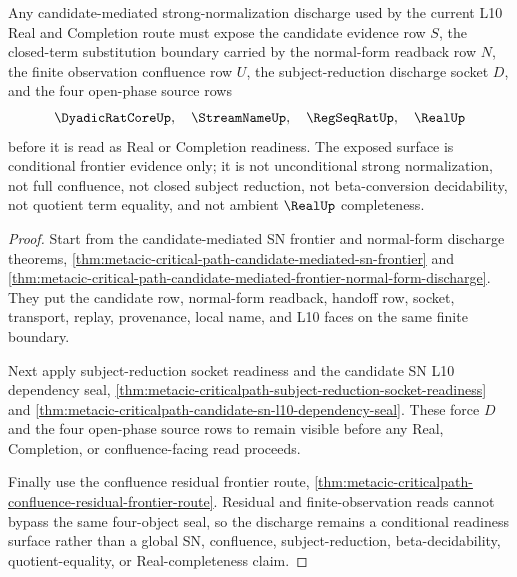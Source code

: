 \begin{theorem}
\label{thm:metacic-critical-path-candidate-mediated-sn-frontier-extension}
Any candidate-mediated strong-normalization discharge used by the current L10 Real and Completion route must expose the candidate evidence row $S$, the closed-term substitution boundary carried by the normal-form readback row $N$, the finite observation confluence row $U$, the subject-reduction discharge socket $D$, and the four open-phase source rows
$$
\DyadicRatCoreUp,\quad
\StreamNameUp,\quad
\RegSeqRatUp,\quad
\RealUp
$$
before it is read as Real or Completion readiness. The exposed surface is conditional frontier evidence only; it is not unconditional strong normalization, not full confluence, not closed subject reduction, not beta-conversion decidability, not quotient term equality, and not ambient $\RealUp$ completeness.
\end{theorem}
\begin{proof}
Start from the candidate-mediated SN frontier and normal-form discharge theorems, \autoref{thm:metacic-critical-path-candidate-mediated-sn-frontier} and \autoref{thm:metacic-critical-path-candidate-mediated-frontier-normal-form-discharge}. They put the candidate row, normal-form readback, handoff row, socket, transport, replay, provenance, local name, and L10 faces on the same finite boundary.

Next apply subject-reduction socket readiness and the candidate SN L10 dependency seal, \autoref{thm:metacic-criticalpath-subject-reduction-socket-readiness} and \autoref{thm:metacic-criticalpath-candidate-sn-l10-dependency-seal}. These force $D$ and the four open-phase source rows to remain visible before any Real, Completion, or confluence-facing read proceeds.

Finally use the confluence residual frontier route, \autoref{thm:metacic-criticalpath-confluence-residual-frontier-route}. Residual and finite-observation reads cannot bypass the same four-object seal, so the discharge remains a conditional readiness surface rather than a global SN, confluence, subject-reduction, beta-decidability, quotient-equality, or Real-completeness claim.
\end{proof}

